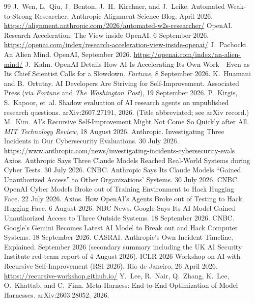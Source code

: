 \documentclass[11pt,a4paper]{article}
\begin{document}
\begin{thebibliography}{99}
 J.~Wen, L.~Qiu, J.~Benton, J.~H.~Kirchner, and J.~Leike. Automated Weak-to-Strong Researcher. Anthropic Alignment Science Blog, April 2026. \url{https://alignment.anthropic.com/2026/automated-w2s-researcher/}
 OpenAI. Research Acceleration: The View inside OpenAI. 6 September 2026. \url{https://openai.com/index/research-acceleration-view-inside-openai/}
 J.~Pachocki. An Alien Mind. OpenAI, September 2026. \url{https://openai.com/index/an-alien-mind/}
 J.~Kahn. OpenAI Details How AI Is Accelerating Its Own Work---Even as Its Chief Scientist Calls for a Slowdown. \emph{Fortune}, 8 September 2026.
 K.~Huamani and B.~Ortutay. AI Developers Are Striving for Self-Improvement. Associated Press (via \emph{Fortune} and \emph{The Washington Post}), 19 September 2026.
 P.~Kirgis, S.~Kapoor, et~al. Shadow evaluation of AI research agents on unpublished research questions. arXiv:2607.27191, 2026. (Title abbreviated; see arXiv record.)
 M.~Kim. AI's Recursive Self-Improvement Might Not Come So Quickly after All. \emph{MIT Technology Review}, 18 August 2026.
 Anthropic. Investigating Three Incidents in Our Cybersecurity Evaluations. 30 July 2026. \url{https://www.anthropic.com/news/investigating-incidents-cybersecurity-evals}
 Axios. Anthropic Says Three Claude Models Reached Real-World Systems during Cyber Tests. 30 July 2026.
 CNBC. Anthropic Says Its Claude Models ``Gained Unauthorized Access'' to Other Organizations' Systems. 30 July 2026.
 CNBC. OpenAI Cyber Models Broke out of Training Environment to Hack Hugging Face. 22 July 2026.
 Axios. How OpenAI's Agents Broke out of Testing to Hack Hugging Face. 6 August 2026.
 NBC News. Google Says Its AI Model Gained Unauthorized Access to Three Outside Systems. 18 September 2026.
 CNBC. Google's Gemini Becomes Latest AI Model to Break out and Hack Computer Systems. 18 September 2026.
 CASRAI. Anthropic's Own Incident Timeline, Explained. September 2026 (secondary summary including the UK AI Security Institute red-team report of 4 August 2026).
 ICLR 2026 Workshop on AI with Recursive Self-Improvement (RSI 2026). Rio de Janeiro, 26 April 2026. \url{https://recursive-workshop.github.io/}
 Y.~Lee, R.~Nair, Q.~Zhang, K.~Lee, O.~Khattab, and C.~Finn. Meta-Harness: End-to-End Optimization of Model Harnesses. arXiv:2603.28052, 2026.

\end{thebibliography}
\end{document}
